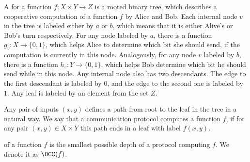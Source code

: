 A  for a function $f\colon X \times Y \to Z$ is a rooted binary tree,
which describes a cooperative computation of a function $f$ by Alice and Bob. Each internal node $v$ in
the tree is labeled either by $a$ or $b$, which means that it is either Alive's or Bob's turn
respectively. For any node labeled by $a$, there is a function $g_v\colon X \to \{0, 1\}$, which helps
Alice to determine which bit she should send, if the computation is currently in this node.  Analogously,
for any node $v$ labeled by $b$, there is a function $h_v\colon Y \to \{0, 1\}$, which helps Bob
determine which bit he should send while in this node. Any internal node also has two descendants. The
edge to the first descendant is labeled by $0$, and the edge to the second one is labeled by $1$. Any
leaf is labeled by an element from the set $Z$.

Any pair of inputs $(x, y)$ defines a path from root to the leaf in the tree in a natural way. We say
that a communication protocol computes a function $f$, if for any pair $(x, y) \in X \times Y$ this path
ends in a leaf with label $f(x, y)$.

 of a function $f$ is the smallest possible depth of a protocol
computing $f$. We denote it as $\DCC(f)$.
